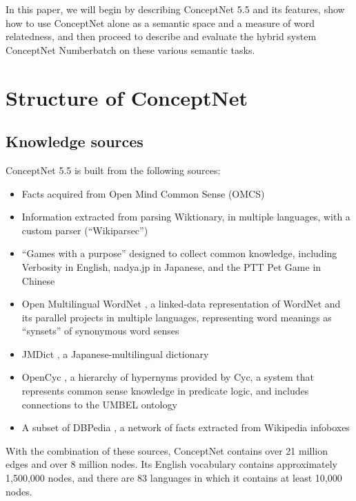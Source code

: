 \documentclass[letterpaper]{article}
\begin{document}
In this paper, we will begin by describing ConceptNet 5.5 and its features,
show how to use ConceptNet alone as a semantic space and a measure of word
relatedness, and then proceed to describe and evaluate the hybrid system
ConceptNet Numberbatch on these various semantic tasks.

\section{Structure of ConceptNet}\label{structure-of-conceptnet}

\subsection{Knowledge sources}\label{knowledge-sources}

ConceptNet 5.5 is built from the following sources:

\begin{itemize}
\item
  Facts acquired from Open Mind Common Sense (OMCS) \cite{singh2002omcs}
\item
  Information extracted from parsing Wiktionary, in multiple languages,
  with a custom parser (``Wikiparsec'')
\item
  ``Games with a purpose'' designed to collect common knowledge,
  including Verbosity \cite{vonahn2006verbosity} in English, nadya.jp
  \cite{nakahara2011nadya} in Japanese, and the PTT Pet Game
  \cite{kuo2009petgame} in Chinese
\item
  Open Multilingual WordNet \cite{bond2013linking}, a linked-data
  representation of WordNet \cite{miller1998wordnet} and its parallel
  projects in multiple languages, representing word meanings as
  ``synsets'' of synonymous word senses
\item
  JMDict \cite{breen2004jmdict}, a Japanese-multilingual dictionary
\item
  OpenCyc \cite{matuszek2006cyc}, a hierarchy of hypernyms provided by
  Cyc, a system that represents common sense knowledge in predicate
  logic, and includes connections to the UMBEL ontology
  \cite{bergman2008umbel}
\item
  A subset of DBPedia \cite{auer2007dbpedia}, a network of facts
  extracted from Wikipedia infoboxes
\end{itemize}

With the combination of these sources, ConceptNet contains over 21
million edges and over 8 million nodes. Its English vocabulary contains
approximately 1,500,000 nodes, and there are 83 languages in which it
contains at least 10,000 nodes.
\end{document}
